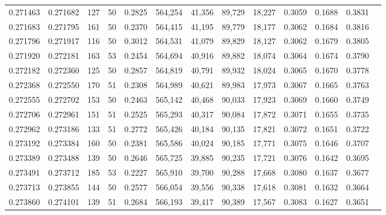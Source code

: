 \begin{tabular}{rrrrrrrrrrrrr}
0.271463 & 0.271682 &   127 &  50 &                                     0.2825 & 564,254 &  41,356 &  89,729 &  18,227 & 0.3059 & 0.1688 & 0.3831 \\
0.271683 & 0.271795 &   161 &  50 &                                     0.2370 & 564,415 &  41,195 &  89,779 &  18,177 & 0.3062 & 0.1684 & 0.3816 \\
0.271796 & 0.271917 &   116 &  50 &                                     0.3012 & 564,531 &  41,079 &  89,829 &  18,127 & 0.3062 & 0.1679 & 0.3805 \\
0.271920 & 0.272181 &   163 &  53 &                                     0.2454 & 564,694 &  40,916 &  89,882 &  18,074 & 0.3064 & 0.1674 & 0.3790 \\
0.272182 & 0.272360 &   125 &  50 &                                     0.2857 & 564,819 &  40,791 &  89,932 &  18,024 & 0.3065 & 0.1670 & 0.3778 \\
0.272368 & 0.272550 &   170 &  51 &                                     0.2308 & 564,989 &  40,621 &  89,983 &  17,973 & 0.3067 & 0.1665 & 0.3763 \\
0.272555 & 0.272702 &   153 &  50 &                                     0.2463 & 565,142 &  40,468 &  90,033 &  17,923 & 0.3069 & 0.1660 & 0.3749 \\
0.272706 & 0.272961 &   151 &  51 &                                     0.2525 & 565,293 &  40,317 &  90,084 &  17,872 & 0.3071 & 0.1655 & 0.3735 \\
0.272962 & 0.273186 &   133 &  51 &                                     0.2772 & 565,426 &  40,184 &  90,135 &  17,821 & 0.3072 & 0.1651 & 0.3722 \\
0.273192 & 0.273384 &   160 &  50 &                                     0.2381 & 565,586 &  40,024 &  90,185 &  17,771 & 0.3075 & 0.1646 & 0.3707 \\
0.273389 & 0.273488 &   139 &  50 &                                     0.2646 & 565,725 &  39,885 &  90,235 &  17,721 & 0.3076 & 0.1642 & 0.3695 \\
0.273491 & 0.273712 &   185 &  53 &                                     0.2227 & 565,910 &  39,700 &  90,288 &  17,668 & 0.3080 & 0.1637 & 0.3677 \\
0.273713 & 0.273855 &   144 &  50 &                                     0.2577 & 566,054 &  39,556 &  90,338 &  17,618 & 0.3081 & 0.1632 & 0.3664 \\
0.273860 & 0.274101 &   139 &  51 &                                     0.2684 & 566,193 &  39,417 &  90,389 &  17,567 & 0.3083 & 0.1627 & 0.3651 \\

\end{tabular}
